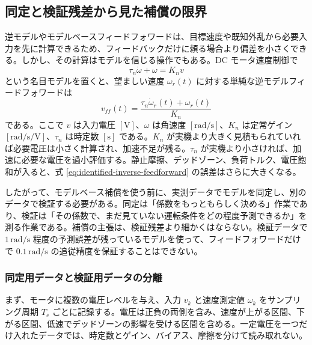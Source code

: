 \subsection{同定と検証残差から見た補償の限界}

逆モデルやモデルベースフィードフォワードは、目標速度や既知外乱から必要入力を先に計算できるため、フィードバックだけに頼る場合より偏差を小さくできる。しかし、その計算はモデルを信じる操作でもある。DC モータ速度制御で
\begin{equation}
  \tau_n\dot{\omega}+\omega=K_n v
\end{equation}
という名目モデルを置くと、望ましい速度 $\omega_r(t)$ に対する単純な逆モデルフィードフォワードは
\begin{equation}
  v_{ff}(t)
  =
  \frac{\tau_n\dot{\omega}_r(t)+\omega_r(t)}{K_n}
  \label{eq:identified-inverse-feedforward}
\end{equation}
である。ここで $v$ は入力電圧 $[\mathrm{V}]$、$\omega$ は角速度 $[\mathrm{rad/s}]$、$K_n$ は定常ゲイン $[\mathrm{rad/s/V}]$、$\tau_n$ は時定数 $[\mathrm{s}]$ である。$K_n$ が実機より大きく見積もられていれば必要電圧は小さく計算され、加速不足が残る。$\tau_n$ が実機より小さければ、加速に必要な電圧を過小評価する。静止摩擦、デッドゾーン、負荷トルク、電圧飽和が入ると、式 \eqref{eq:identified-inverse-feedforward} の誤差はさらに大きくなる。

したがって、モデルベース補償を使う前に、実測データでモデルを同定し、別のデータで検証する必要がある。同定は「係数をもっともらしく決める」作業であり、検証は「その係数で、まだ見ていない運転条件をどの程度予測できるか」を測る作業である。補償の主張は、検証残差より細かくはならない。検証データで $1\,\mathrm{rad/s}$ 程度の予測誤差が残っているモデルを使って、フィードフォワードだけで $0.1\,\mathrm{rad/s}$ の追従精度を保証することはできない。

\subsubsection{同定用データと検証用データの分離}

まず、モータに複数の電圧レベルを与え、入力 $v_k$ と速度測定値 $\omega_k$ をサンプリング周期 $T_s$ ごとに記録する。電圧は正負の両側を含み、速度が上がる区間、下がる区間、低速でデッドゾーンの影響を受ける区間を含める。一定電圧を一つだけ入れたデータでは、時定数とゲイン、バイアス、摩擦を分けて読み取れない。

